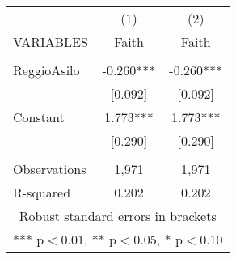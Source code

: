 \begin{tabular}{lcc} \hline
 & (1) & (2) \\
VARIABLES & Faith & Faith \\ \hline
 &  &  \\
ReggioAsilo & -0.260*** & -0.260*** \\
 & [0.092] & [0.092] \\
Constant & 1.773*** & 1.773*** \\
 & [0.290] & [0.290] \\
 &  &  \\
Observations & 1,971 & 1,971 \\
 R-squared & 0.202 & 0.202 \\ \hline
\multicolumn{3}{c}{ Robust standard errors in brackets} \\
\multicolumn{3}{c}{ *** p$<$0.01, ** p$<$0.05, * p$<$0.10} \\
\end{tabular}
